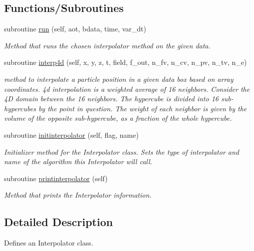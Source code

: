 \subsection*{Functions/\+Subroutines}
\begin{DoxyCompactItemize}
\item 
subroutine \mbox{\hyperlink{namespaceinterpolator__mod_ab4d61e34f8feebf8c75e988a6c7cac85}{run}} (self, aot, bdata, time, var\+\_\+dt)
\begin{DoxyCompactList}\small\item\em Method that runs the chosen interpolator method on the given data. \end{DoxyCompactList}\item 
subroutine \mbox{\hyperlink{namespaceinterpolator__mod_a1bf15b6fa6e4fd0bb4a8e544994c487d}{interp4d}} (self, x, y, z, t, field, f\+\_\+out, n\+\_\+fv, n\+\_\+cv, n\+\_\+pv, n\+\_\+tv, n\+\_\+e)
\begin{DoxyCompactList}\small\item\em method to interpolate a particle position in a given data box based on array coordinates. 4d interpolation is a weighted average of 16 neighbors. Consider the 4D domain between the 16 neighbors. The hypercube is divided into 16 sub-\/hypercubes by the point in question. The weight of each neighbor is given by the volume of the opposite sub-\/hypercube, as a fraction of the whole hypercube. \end{DoxyCompactList}\item 
subroutine \mbox{\hyperlink{namespaceinterpolator__mod_adcaf3bba800f19991ed4f33c968184e9}{initinterpolator}} (self, flag, name)
\begin{DoxyCompactList}\small\item\em Initializer method for the Interpolator class. Sets the type of interpolator and name of the algorithm this Interpolator will call. \end{DoxyCompactList}\item 
subroutine \mbox{\hyperlink{namespaceinterpolator__mod_a9b149bc8a3da5d1864b8c049f8b00697}{printinterpolator}} (self)
\begin{DoxyCompactList}\small\item\em Method that prints the Interpolator information. \end{DoxyCompactList}\end{DoxyCompactItemize}


\subsection{Detailed Description}
Defines an Interpolator class. 

